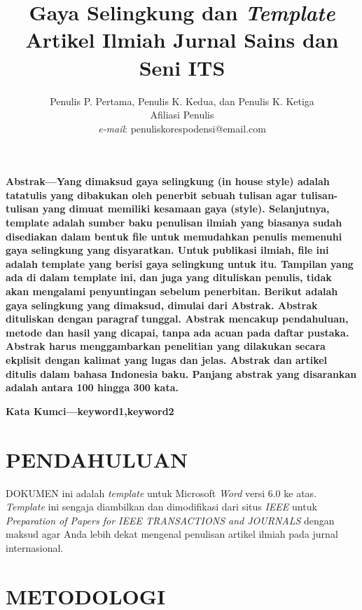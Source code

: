 \documentclass[12pt,a4paper]{article}
\title{\fontsize{24pt}{28pt}\selectfont Gaya Selingkung dan \textit{Template} Artikel Ilmiah Jurnal Sains dan Seni ITS}
\author{
  \vspace{-3pt}\fontsize{11pt}{13pt}\selectfont Penulis P. Pertama, Penulis K. Kedua, dan Penulis K. Ketiga\\
    \vspace{-3pt}\fontsize{11pt}{13pt}\selectfont Afiliasi Penulis\\
    \fontsize{11pt}{13pt}\selectfont\textit{e-mail}: penuliskorespodensi@email.com
}
\date{}
\newcommand{\smallcaps}[1]{\textsc{#1}}
\begin{document}
\maketitle
\thispagestyle{fancy}

\begin{multicols}{2}
\textbf{Abstrak—Yang dimaksud gaya selingkung (in house style) adalah tatatulis yang dibakukan oleh penerbit sebuah tulisan agar tulisan-tulisan yang dimuat memiliki kesamaan gaya (style). Selanjutnya, template adalah sumber baku penulisan ilmiah yang biasanya sudah disediakan dalam bentuk file untuk memudahkan penulis memenuhi gaya selingkung yang disyaratkan. Untuk publikasi ilmiah, file ini adalah template yang berisi gaya selingkung untuk itu. Tampilan yang ada di dalam template ini, dan juga yang dituliskan penulis, tidak akan mengalami penyuntingan sebelum penerbitan. Berikut adalah gaya selingkung yang dimaksud, dimulai dari Abstrak. Abstrak dituliskan dengan paragraf tunggal. Abstrak mencakup pendahuluan, metode dan hasil yang dicapai, tanpa ada acuan pada daftar pustaka. Abstrak harus menggambarkan penelitian yang dilakukan secara ekplisit dengan kalimat yang lugas dan jelas. Abstrak dan artikel ditulis dalam bahasa Indonesia baku.  Panjang abstrak yang disarankan adalah antara 100 hingga 300 kata.}\par\vspace{0.5\baselineskip}
\textbf{Kata Kumci—keyword1,keyword2}
\section{PENDAHULUAN}
\lettrine[lines=2, lraise=-0, nindent=0pt, findent=-1pt]
{\fontsize{28pt}{28pt}\selectfont D}{}\smallcaps{OKUMEN} ini adalah \textit{template} untuk Microsoft \textit{Word} versi 6.0 ke atas. \textit{Template} ini sengaja diambilkan dan dimodifikasi dari situs \textit{IEEE} untuk \textit{Preparation of Papers for IEEE TRANSACTIONS and JOURNALS} dengan maksud agar Anda lebih dekat mengenal penulisan artikel ilmiah pada jurnal internasional.\cite{1}
\section{METODOLOGI}
\lipsum

\end{multicols}
\end{document}
